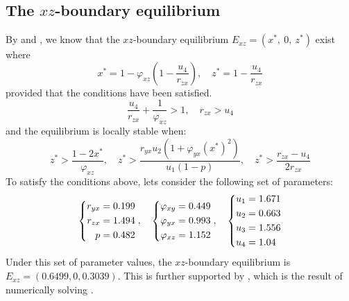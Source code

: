 \subsection{The $xz$-boundary equilibrium}\label{subsec:numsim_xz_boundary_equilibrium}
By  and , we know that the $xz$-boundary equilibrium $E_{xz}=\left(x^*,\ 0,\ z^*\right)$ exist where
\begin{equation*}
    x^*=1-\varphi_{xz}\left(1-\frac{u_4}{r_{zx}}\right),\quad
    z^*=1-\frac{u_4}{r_{zx}}
\end{equation*}
provided that the conditions have been satisfied.
\begin{equation*}
    \frac{u_4}{r_{zx}}+\frac{1}{\varphi_{xz}} > 1,\quad 
    r_{zx}>u_4
\end{equation*}
and the equilibrium is locally stable when:
\begin{equation*}
    z^*>\frac{1-2x^*}{\varphi_{xz}},\quad
    z^*>\frac{r_{yx}u_2\left(1+\varphi_{yx}\left(x^*\right)^2\right)}{u_1\left(1-p\right)},\quad
    z^*>\frac{r_{zx}-u_4}{2r_{zx}}
\end{equation*}
To satisfy the conditions above, lets consider the following set of parameters:
\begin{equation}\label{params:boundary-xz}
    \begin{dcases}
        \begin{aligned}
            r_{yx} &= 0.199\\
            r_{zx} &= 1.494\\
            p &= 0.482
        \end{aligned}
    \end{dcases},\quad 
    \begin{dcases}
        \begin{aligned}
            \varphi_{xy} &= 0.449\\
            \varphi_{yx} &= 0.993\\
            \varphi_{xz} &= 1.152
        \end{aligned}
    \end{dcases},\quad
    \begin{dcases}
        \begin{aligned}
            u_1 &= 1.671\\
            u_2 &= 0.663\\
            u_3 &= 1.556\\
            u_4 &= 1.04
        \end{aligned}
    \end{dcases}
\end{equation}
Under this set of parameter values, the $xz$-boundary equilibrium is $E_{xz}=(0.6499,0,0.3039)$. This is further supported by , which is the result of numerically solving .

